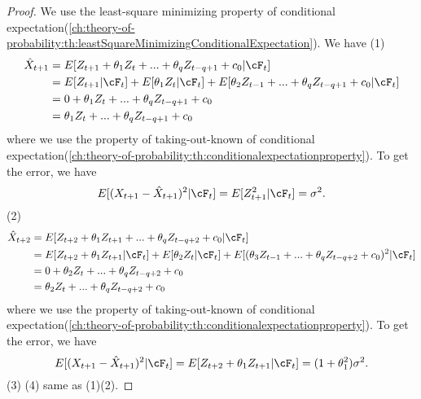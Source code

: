 \begin{proof}
	We use the least-square minimizing property of conditional expectation(\autoref{ch:theory-of-probability:th:leastSquareMinimizingConditionalExpectation}). We have	
	(1) 
	\begin{align*}
	\hat{X}_{t+1} &= E[Z_{t+1} + \theta_1 Z_{t} + ... + \theta_q Z_{t-q+1} + c_0|\cF_t] \\
	&= E[Z_{t+1}|\cF_t] + E[\theta_1 Z_{t}|\cF_t] + E[\theta_2 Z_{t-1} + ... +\theta_q Z_{t-q+1} + c_0|\cF_t] \\
	&=0 + \theta_1 Z_{t} + ... + \theta_q Z_{t-q+1} + c_0 \\
	&=\theta_1 Z_{t} + ... + \theta_q Z_{t-q+1} + c_0
	\end{align*}
	where we use the property of taking-out-known of conditional expectation(\autoref{ch:theory-of-probability:th:conditionalexpectationproperty}).
	To get the error, we have
	$$E[(X_{t+1} - \hat{X}_{t+1})^2|\cF_t] = E[Z_{t+1}^2|\cF_t] = \sigma^2.$$
	(2) 
	\begin{align*}
\hat{X}_{t+2} &= E[Z_{t+2} + \theta_1 Z_{t+1} + ... + \theta_q Z_{t-q+2} + c_0|\cF_t] \\
&= E[Z_{t+2} + \theta_1 Z_{t+1}|\cF_t] + E[\theta_2 Z_{t}|\cF_t] + E[(\theta_3 Z_{t-1} + ... +\theta_q Z_{t-q+2} + c_0)^2|\cF_t] \\
&=0 + \theta_2 Z_{t} + ... + \theta_q Z_{t-q+2} + c_0 \\
&=\theta_2 Z_{t} + ... + \theta_q Z_{t-q+2} + c_0
\end{align*}
	where we use the property of taking-out-known of conditional expectation(\autoref{ch:theory-of-probability:th:conditionalexpectationproperty}).
	To get the error, we have
	$$E[(X_{t+1} - \hat{X}_{t+1})^2|\cF_t] = E[Z_{t+2} + \theta_1Z_{t+1}|\cF_t] = (1 + \theta_1^2)\sigma^2.$$
	(3)
	(4) same as (1)(2).
\end{proof}

